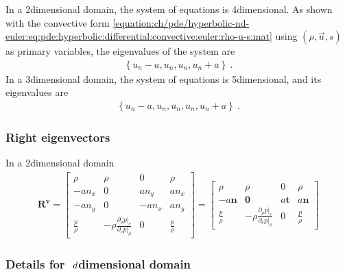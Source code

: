 \documentclass[letterpaper,10pt,english]{jupyterBook}
\begin{document}
\sphinxAtStartPar
In a 2\sphinxhyphen{}dimensional domain, the system of equations is 4\sphinxhyphen{}dimensional. As shown with the convective form \eqref{equation:ch/pde/hyperbolic-nd-euler:eq:pde:hyperbolic:differential:convective:euler:rho-u-s:mat} using \((\rho, \vec{u}, s)\) as primary variables, the eigenvalues of the system are
\begin{equation*}
\begin{split}\left\{ u_n - a, u_n, u_n, u_n + a \right\} \ .\end{split}
\end{equation*}
\sphinxAtStartPar
In a 3\sphinxhyphen{}dimensional domain, the system of equations is 5\sphinxhyphen{}dimensional, and its eigenvalues are
\begin{equation*}
\begin{split}\left\{ u_n - a, u_n, u_n, u_n, u_n + a \right\} \ .\end{split}
\end{equation*}\subsubsection*{Right eigenvectors}

\sphinxAtStartPar
In a 2\sphinxhyphen{}dimensional domain
\begin{equation*}
\begin{split}
\mathbf{R}^\mathbf{v} =
\begin{bmatrix}
  \rho            & \rho                                                   & 0     & \rho  \\
 -a n_x           & 0                                                      & a n_y & a n_x \\
 -a n_y           & 0                                                      &-a n_x & a n_y \\
  \frac{p}{\rho}  & -\rho \frac{\partial_\rho p|_e}{\partial_e p|_{\rho}}  & 0     & \frac{p}{\rho}
\end{bmatrix}
=
\begin{bmatrix}
  \rho            & \rho                                                   & 0               & \rho  \\
 -a \mathbf{n}    & \mathbf{0}                                             & a \mathbf{t}    & a \mathbf{n} \\
  \frac{p}{\rho}  & -\rho \frac{\partial_\rho p|_e}{\partial_e p|_{\rho}}  & 0               & \frac{p}{\rho}
\end{bmatrix}
\end{split}
\end{equation*}\subsubsection*{Details for \protect\( \ d\protect\)\sphinxhyphen{}dimensional domain}
\end{document}
